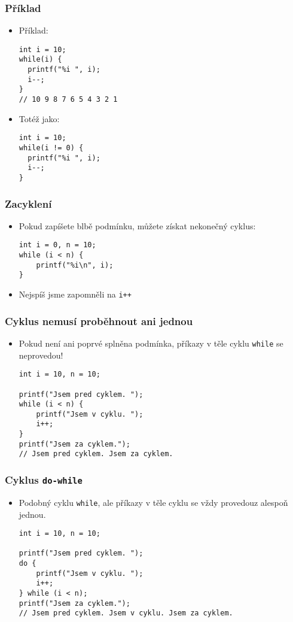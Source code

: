 \documentclass{beamer}
\newenvironment{itemizex}%
  {\large \begin{itemize}%
    \setlength{\itemsep}{8pt}%
    \setlength{\parskip}{8pt}}%
  {\end{itemize}}
\begin{document}
\begin{frame}[t,fragile]\frametitle{Příklad} 
  \begin{itemize}
    \item Příklad:
    \begin{verbatim} 
int i = 10;
while(i) {
  printf("%i ", i);
  i--;
}
// 10 9 8 7 6 5 4 3 2 1 
    \end{verbatim}
  \item Totéž jako:
  \begin{verbatim} 
int i = 10;
while(i != 0) {
  printf("%i ", i);
  i--;
}
    \end{verbatim}
  \end{itemize}
\end{frame}


\begin{frame}[t,fragile]\frametitle{Zacyklení} 
  \begin{itemizex}
    \item Pokud zapíšete blbě podmínku, můžete získat nekonečný cyklus:
    \begin{verbatim} 
int i = 0, n = 10;
while (i < n) {
    printf("%i\n", i);
}
    \end{verbatim}
    \item Nejspíš jsme zapomněli na \texttt{i++}
  \end{itemizex}
\end{frame}


\begin{frame}[t,fragile]\frametitle{Cyklus nemusí proběhnout ani jednou} 
  \begin{itemizex}
    \item Pokud není ani poprvé splněna podmínka, příkazy v těle cyklu \texttt{while} se neprovedou!
    \begin{verbatim} 
int i = 10, n = 10;

printf("Jsem pred cyklem. ");
while (i < n) {
    printf("Jsem v cyklu. ");
    i++;
}
printf("Jsem za cyklem.");
// Jsem pred cyklem. Jsem za cyklem.
    \end{verbatim}
  \end{itemizex}
\end{frame}


\begin{frame}[t,fragile]\frametitle{Cyklus \texttt{do-while}} 
  \begin{itemizex}
    \item Podobný cyklu \texttt{while}, ale příkazy v těle cyklu se vždy provedouz alespoň jednou.
    \begin{verbatim} 
int i = 10, n = 10;

printf("Jsem pred cyklem. ");
do {
    printf("Jsem v cyklu. ");
    i++;
} while (i < n);
printf("Jsem za cyklem.");
// Jsem pred cyklem. Jsem v cyklu. Jsem za cyklem.
    \end{verbatim}
  \end{itemizex}
\end{frame}
\end{document}
